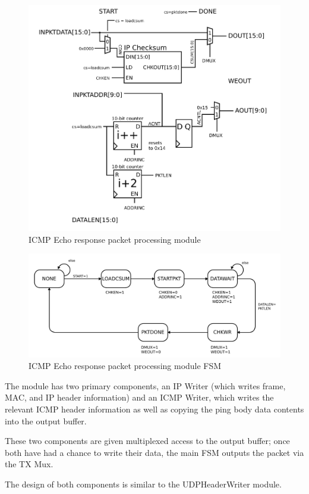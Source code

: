 \begin{figure}
\begin{centering}
\includegraphics[scale=0.8]{ping.icmp.svg}
\end{centering}
\caption{ICMP Echo response packet processing module}
\label{ping}
\end{figure}

\begin{figure}
\begin{centering}
\includegraphics[scale=0.8]{ping.icmp.fsm.svg}
\end{centering}
\caption{ICMP Echo response packet processing module FSM}
\label{ping.fsm}
\end{figure}

The module has two primary components, an IP Writer (which writes
frame, MAC, and IP header information) and an ICMP Writer, which
writes the relevant ICMP header information as well as copying the
ping body data contents into the output buffer.

These two components are given multiplexed access to the output
buffer; once both have had a chance to write their data, the main FSM
outputs the packet via the TX Mux.

The design of both components is similar to the UDPHeaderWriter module. 

